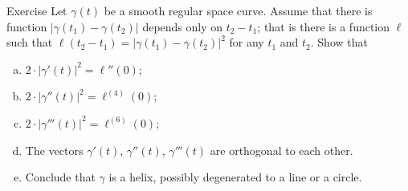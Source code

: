 \begin{thm}{Exercise}
Let $\gamma(t)$ be a smooth regular space curve.
Assume that there is function $|\gamma(t_1)-\gamma(t_2)|$ depends only on $t_2-t_1$;
that is there is a function $\ell$ such that $\ell(t_2-t_1)=|\gamma(t_1)-\gamma(t_2)|^2$ for any $t_1$ and $t_2$.
Show that 
\begin{enumerate}[(a)]
\item $2\cdot|\gamma'(t)|^2=\ell''(0)$;
\item $2\cdot|\gamma''(t)|^2=\ell^{(4)}(0)$;
\item $2\cdot|\gamma'''(t)|^2=\ell^{(6)}(0)$;
\item The vectors $\gamma'(t)$, $\gamma''(t)$, $\gamma'''(t)$ are orthogonal to each other.
\item Conclude that $\gamma$ is a helix, possibly degenerated to a line or a circle. 
\end{enumerate}

\end{thm}


